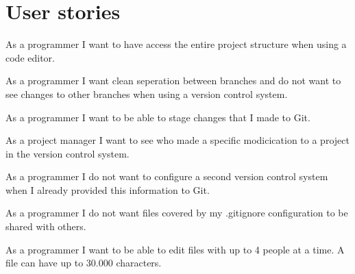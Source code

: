 \chapter{User stories}

As a programmer I want to have access the entire project structure when using a code editor.

As a programmer I want clean seperation between branches and do not want to see changes to other branches when using a version control system.

As a programmer I want to be able to stage changes that I made to Git.

As a project manager I want to see who made a specific modicication to a project in the version control system.

As a programmer I do not want to configure a second version control system when I already provided this information to Git.

As a programmer I do not want files covered by my .gitignore configuration to be shared with others.

As a programmer I want to be able to edit files with up to 4 people at a time. A file can have up to 30.000 characters.